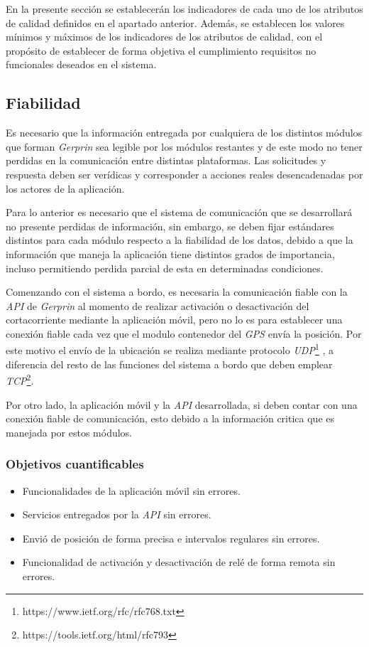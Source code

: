 En la presente sección se establecerán los indicadores de cada uno de los atributos de calidad definidos en el apartado anterior. Además, se establecen los valores mínimos y máximos de los indicadores de los atributos de calidad, con el propósito de establecer de forma objetiva el cumplimiento requisitos no funcionales deseados en el sistema.

\subsection{Fiabilidad}

Es necesario que la información entregada por cualquiera de los distintos módulos que forman \emph{Gerprin} sea legible por los módulos restantes y de este modo no tener perdidas en la comunicación entre distintas plataformas. Las solicitudes y respuesta deben ser verídicas y corresponder a acciones reales desencadenadas por los actores de la aplicación.

Para lo anterior es necesario que el sistema de comunicación que se desarrollará no presente perdidas de información, sin embargo, se deben fijar estándares distintos para cada módulo respecto a la fiabilidad de los datos, debido a que la información que maneja la aplicación tiene distintos grados de importancia, incluso permitiendo perdida parcial de esta en determinadas condiciones.

Comenzando con el sistema a bordo, es necesaria la comunicación fiable con la \emph{API} de \emph{Gerprin} al momento de realizar activación o desactivación del cortacorriente mediante la aplicación móvil, pero no lo es para establecer una conexión fiable cada vez que el modulo contenedor del \emph{GPS} envía la posición. Por este motivo el envío de la ubicación se realiza mediante protocolo \emph{UDP}\footnote{https://www.ietf.org/rfc/rfc768.txt} , a diferencia del resto de las funciones del sistema a bordo que deben emplear \emph{TCP}\footnote{https://tools.ietf.org/html/rfc793}.

Por otro lado, la aplicación móvil y la \emph{API} desarrollada, si deben contar con una conexión fiable de comunicación, esto debido a la información critica que es manejada por estos módulos.

\subsubsection{Objetivos cuantificables}

\begin{itemize}
	\item
	Funcionalidades de la aplicación móvil sin errores.
	\item
	Servicios entregados por la \emph{API} sin errores.
	\item
	Envió de posición de forma precisa e intervalos regulares sin errores.
	\item
	Funcionalidad de activación y desactivación de relé de forma remota sin errores.
\end{itemize}

